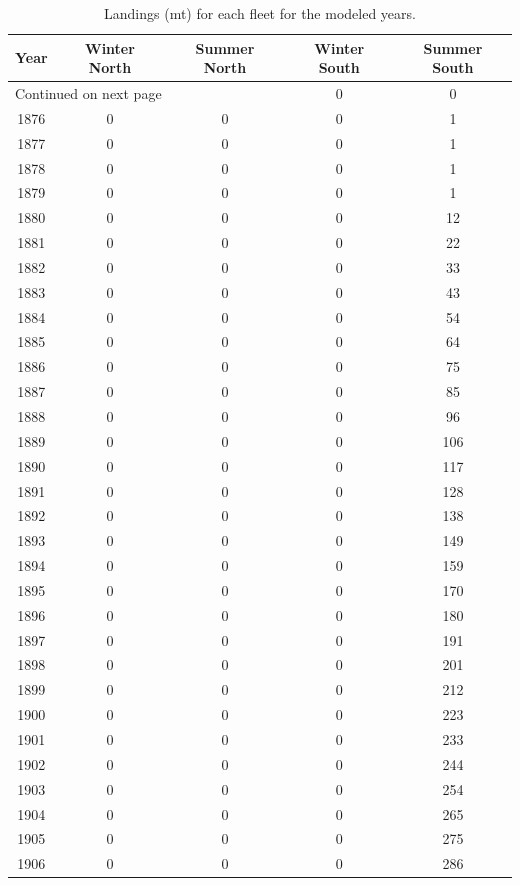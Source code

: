 \documentclass[12pt,]{article}
\begin{document}
\begin{center}
\begin{longtable}{ccccc}
\caption{Landings (mt) for each fleet for the modeled years.} \\ 
  \hline
Year & Winter North & Summer North & Winter South & Summer South \\ 
  \hline 
\endhead 
\hline 
\multicolumn{3}{l}{\footnotesize Continued on next page} 
\endfoot 
\endlastfoot 
 \hline
1875 & 0 & 0 & 0 & 0 \\ 
  1876 & 0 & 0 & 0 & 1 \\ 
  1877 & 0 & 0 & 0 & 1 \\ 
  1878 & 0 & 0 & 0 & 1 \\ 
  1879 & 0 & 0 & 0 & 1 \\ 
  1880 & 0 & 0 & 0 & 12 \\ 
  1881 & 0 & 0 & 0 & 22 \\ 
  1882 & 0 & 0 & 0 & 33 \\ 
  1883 & 0 & 0 & 0 & 43 \\ 
  1884 & 0 & 0 & 0 & 54 \\ 
  1885 & 0 & 0 & 0 & 64 \\ 
  1886 & 0 & 0 & 0 & 75 \\ 
  1887 & 0 & 0 & 0 & 85 \\ 
  1888 & 0 & 0 & 0 & 96 \\ 
  1889 & 0 & 0 & 0 & 106 \\ 
  1890 & 0 & 0 & 0 & 117 \\ 
  1891 & 0 & 0 & 0 & 128 \\ 
  1892 & 0 & 0 & 0 & 138 \\ 
  1893 & 0 & 0 & 0 & 149 \\ 
  1894 & 0 & 0 & 0 & 159 \\ 
  1895 & 0 & 0 & 0 & 170 \\ 
  1896 & 0 & 0 & 0 & 180 \\ 
  1897 & 0 & 0 & 0 & 191 \\ 
  1898 & 0 & 0 & 0 & 201 \\ 
  1899 & 0 & 0 & 0 & 212 \\ 
  1900 & 0 & 0 & 0 & 223 \\ 
  1901 & 0 & 0 & 0 & 233 \\ 
  1902 & 0 & 0 & 0 & 244 \\ 
  1903 & 0 & 0 & 0 & 254 \\ 
  1904 & 0 & 0 & 0 & 265 \\ 
  1905 & 0 & 0 & 0 & 275 \\ 
  1906 & 0 & 0 & 0 & 286 \\ 

\end{longtable}
\end{center}
\end{document}
